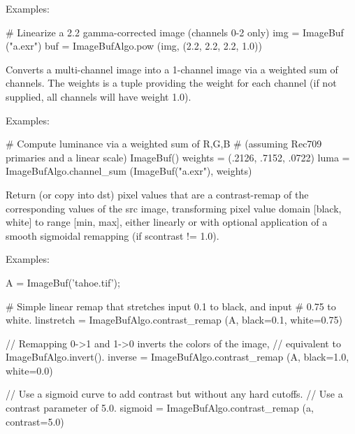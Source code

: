 \smallskip
\noindent Examples:
\begin{code}
    # Linearize a 2.2 gamma-corrected image (channels 0-2 only)
    img = ImageBuf ("a.exr")
    buf = ImageBufAlgo.pow (img, (2.2, 2.2, 2.2, 1.0))
\end{code}
\apiend


 
Converts a multi-channel image into a 1-channel image via a weighted sum
of channels. The {\cf weights} is a tuple providing the weight for each 
channel (if not supplied, all channels will have weight 1.0).

\smallskip
\noindent Examples:
\begin{code}
    # Compute luminance via a weighted sum of R,G,B
    # (assuming Rec709 primaries and a linear scale)
    ImageBuf()
    weights = (.2126, .7152, .0722)
    luma = ImageBufAlgo.channel_sum (ImageBuf("a.exr"), weights)
\end{code}
\apiend


 

Return (or copy into {\cf dst}) pixel values that are a contrast-remap
of the corresponding values of the {\cf src} image, transforming pixel
value domain [black, white] to range [min, max], either linearly or with
optional application of a smooth sigmoidal remapping (if scontrast != 1.0).

\smallskip
\noindent Examples:
\begin{code}
    A = ImageBuf('tahoe.tif');

    # Simple linear remap that stretches input 0.1 to black, and input
    # 0.75 to white.
    linstretch = ImageBufAlgo.contrast_remap (A, black=0.1, white=0.75)

    // Remapping 0->1 and 1->0 inverts the colors of the image,
    // equivalent to ImageBufAlgo.invert().
    inverse = ImageBufAlgo.contrast_remap (A, black=1.0, white=0.0)

    // Use a sigmoid curve to add contrast but without any hard cutoffs.
    // Use a contrast parameter of 5.0.
    sigmoid = ImageBufAlgo.contrast_remap (a, contrast=5.0)
\end{code}
\apiend

